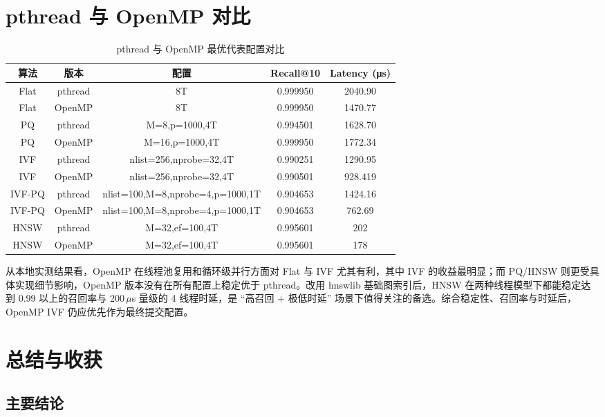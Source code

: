 \documentclass[a4paper]{article}
\begin{document}
\section{pthread 与 OpenMP 对比}

\begin{table}[htbp]
\centering
\caption{pthread 与 OpenMP 最优代表配置对比}
\begin{tabular}{ccccc}
\toprule
算法 & 版本 & 配置 & Recall@10 & Latency (μs) \\
\midrule
Flat & pthread & 8T & 0.999950 & 2040.90 \\
Flat & OpenMP & 8T & 0.999950 & 1470.77 \\
PQ & pthread & M=8,p=1000,4T & 0.994501 & 1628.70 \\
PQ & OpenMP & M=16,p=1000,4T & 0.999950 & 1772.34 \\
IVF & pthread & nlist=256,nprobe=32,4T & 0.990251 & 1290.95 \\
IVF & OpenMP & nlist=256,nprobe=32,4T & 0.990501 & 928.419 \\
IVF-PQ & pthread & nlist=100,M=8,nprobe=4,p=1000,1T & 0.904653 & 1424.16 \\
IVF-PQ & OpenMP & nlist=100,M=8,nprobe=4,p=1000,1T & 0.904653 & 762.69 \\
HNSW & pthread & M=32,ef=100,4T & 0.995601 & 202 \\
HNSW & OpenMP & M=32,ef=100,4T & 0.995601 & 178 \\
\bottomrule
\end{tabular}
\end{table}

从本地实测结果看，OpenMP 在线程池复用和循环级并行方面对 Flat 与 IVF 尤其有利，其中 IVF 的收益最明显；而 PQ/HNSW 则更受具体实现细节影响，OpenMP 版本没有在所有配置上稳定优于 pthread。改用 hnswlib 基础图索引后，HNSW 在两种线程模型下都能稳定达到 0.99 以上的召回率与 200\,$\mu$s 量级的 4 线程时延，是 ``高召回 + 极低时延'' 场景下值得关注的备选。综合稳定性、召回率与时延后，OpenMP IVF 仍应优先作为最终提交配置。

\section{总结与收获}

\subsection{主要结论}
\end{document}
